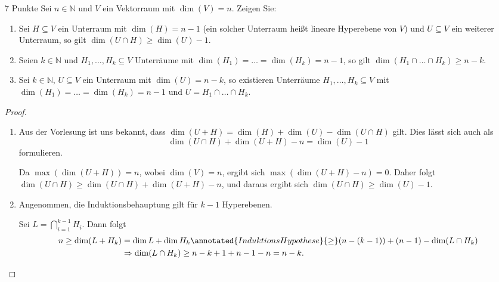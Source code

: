 \documentclass{../problemset}
\begin{document}
\begin{problem}{7 Punkte}
Sei $n \in \mathbb{N}$ und $V$ ein Vektorraum mit $\dim(V) = n$. Zeigen Sie:
\begin{enumerate}
	\item Sei $H \subseteq V$ ein Unterraum mit $\dim(H) = n - 1$ (ein solcher Unterraum heißt lineare Hyperebene von $V$) und $U \subseteq V$ ein weiterer Unterraum, so gilt $\dim(U \cap H) \geq \dim(U) - 1$.
	\item Seien $k \in \mathbb{N}$ und $H_1, \ldots, H_k \subseteq V$ Unterräume mit $\dim(H_1) = \ldots = \dim(H_k) = n - 1$, so gilt $\dim(H_1 \cap \ldots \cap H_k) \geq n - k$.
	\item Sei $k \in \mathbb{N}$, $U \subseteq V$ ein Unterraum mit $\dim(U) = n - k$, so existieren Unterräume $H_1, \ldots, H_k \subseteq V$ mit $\dim(H_1) = \ldots = \dim(H_k) = n - 1$ und $U = H_1 \cap \ldots \cap H_k$.
\end{enumerate}

\begin{proof}
	$ $
	\begin{enumerate}
		\item Aus der Vorlesung ist uns bekannt, dass $\dim(U+H) = \dim(H) + \dim(U) - \dim(U \cap H)$ gilt.
		      Dies lässt sich auch als \[
			      \dim(U \cap H) + \dim(U + H) - n = \dim(U) - 1
		      \] formulieren.

		      Da $\max(\dim(U + H)) = n$, wobei $\dim(V) = n$, ergibt sich $\max(\dim(U + H) - n) = 0$.
		      Daher folgt $\dim(U \cap H) \ge \dim(U \cap H) + \dim(U + H) - n$, und daraus ergibt sich $\dim(U \cap H) \geq \dim(U) - 1$.

		\item Angenommen, die Induktionsbehauptung gilt für $k-1$ Hyperebenen.

		      Sei $L = \bigcap_{i=1}^{k-1} H_i$. Dann folgt
		      \begin{align*}
			      n \ge \dim(L + H_k) & = \dim L + \dim H_k \annotated{Induktions Hypothese}{\ge} (n - (k-1)) + (n-1) - \dim(L \cap H_k) \\
			                          & \Rightarrow \dim(L \cap H_k) \ge n - k + 1 + n - 1 - n = n - k.
		      \end{align*}

	\end{enumerate}
\end{proof}
\end{problem}
\end{document}
